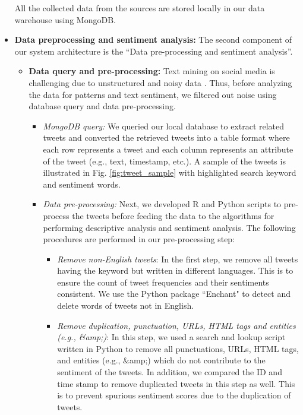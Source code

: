 \documentclass[conference]{IEEEtran}
\begin{document}
\begin{itemize}
\begin{itemize}
		\end{itemize}
		\noindent All the collected data from the sources are stored locally in our data warehouse using MongoDB. 
		
		\item {\bf Data preprocessing and sentiment analysis:} The second component of our system architecture is the ``Data pre-processing and sentiment analysis''.  
		
		\begin{itemize}
			\item{\bf Data query and pre-processing:} Text mining on social media is challenging due to unstructured and noisy data \cite{b21}. Thus, before analyzing the data for patterns and text sentiment, we filtered out noise using database query and data pre-processing.  
			\begin{itemize}
				\item {\it MongoDB query:} We queried our local database to extract related tweets and converted the retrieved tweets into a table format where each row represents a tweet and each column represents an attribute of the tweet (e.g., text, timestamp, etc.). 
				A sample of the tweets is illustrated in Fig. \ref{fig:tweet_sample} with highlighted search keyword and sentiment words.
				\item {\it Data pre-processing:} Next, we developed R and Python scripts to pre-process the tweets before feeding the data to the algorithms for performing descriptive analysis and sentiment analysis. The following procedures are performed in our pre-processing step:
				\begin{itemize}
					\item{\it Remove non-English tweets}: In the first step, we remove all tweets having the keyword but written in different languages. This is to ensure the count of tweet frequencies and their sentiments consistent. We use the Python package ``Enchant" \cite{b16} to detect and delete words of tweets not in English.
					\item {\it Remove duplication, punctuation, URLs, HTML tags and entities (e.g., \&amp;)}: In this step, we used a search and lookup script written in Python to remove all punctuations, URLs, HTML tags, and entities (e.g., \&amp;) which do not contribute to the sentiment of the tweets. In addition, we compared the ID and time stamp to remove duplicated tweets in this step as well. This is to prevent spurious sentiment scores due to the duplication of tweets.
					

\end{itemize}
\end{itemize}
\end{itemize}
\end{itemize}
\end{document}
